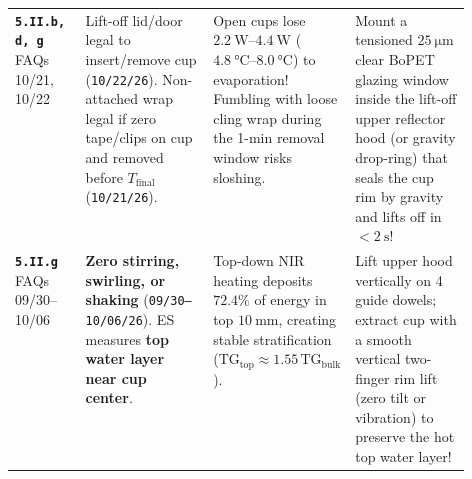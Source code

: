 \begin{center}
\begin{tabularx}{\linewidth}{@{}l>{\raggedright\arraybackslash}p{0.28\linewidth}>{\raggedright\arraybackslash}p{0.25\linewidth}>{\raggedright\arraybackslash}X@{}}
\rowcolor{rowalt}\textbf{\texttt{5.II.b, d, g}} \newline FAQs 10/21, 10/22 & Lift-off lid/door legal to insert/remove cup (\texttt{10/22/26}). Non-attached wrap legal if zero tape/clips on cup and removed before $T_{\mathrm{final}}$ (\texttt{10/21/26}). & Open cups lose $\SIrange{2.2}{4.4}{\watt}$ ($\SIrange{4.8}{8.0}{\celsius}$) to evaporation! Fumbling with loose cling wrap during the 1-min removal window risks sloshing. & Mount a tensioned $\SI{25}{\micro\meter}$ clear BoPET glazing window inside the lift-off upper reflector hood (or gravity drop-ring) that seals the cup rim by gravity and lifts off in $<\SI{2}{\second}$! \\
\textbf{\texttt{5.II.g}} \newline FAQs 09/30--10/06 & \textbf{Zero stirring, swirling, or shaking} (\texttt{09/30--10/06/26}). ES measures \textbf{top water layer near cup center}. & Top-down NIR heating deposits $72.4\%$ of energy in top $\SI{10}{\milli\meter}$, creating stable stratification ($\mathrm{TG}_{\mathrm{top}} \approx 1.55\,\mathrm{TG}_{\mathrm{bulk}}$). & Lift upper hood vertically on 4 guide dowels; extract cup with a smooth vertical two-finger rim lift (zero tilt or vibration) to preserve the hot top water layer! \\
\bottomrule
\end{tabularx}
\end{center}

